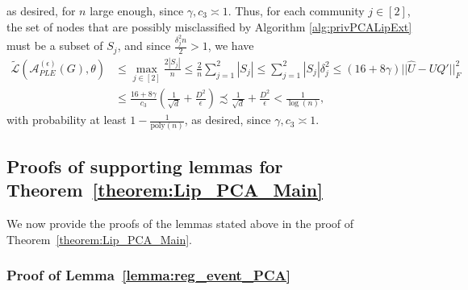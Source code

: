 \documentclass{article}
\begin{document}
as desired, for $n$ large enough, since $\gamma, c_3 \asymp 1$. Thus, for each
community $j \in [2]$, the set of nodes that are possibly misclassified by Algorithm \ref{alg:privPCALipExt} must be a subset of $S_j$, and since $\frac{\delta_j^2n}{2} > 1$, we have
\begin{align*}
\widetilde{\mathcal{L}}\left(\mathcal{A}_{PLE}^{(\epsilon)}(G), \theta\right) &\leq \mathop{\max}_{j \in [2]}\frac{2|S_j|}{n} \leq \frac{2}{n}\sum_{j = 1}^2|S_j| \leq \sum_{j = 1}^2|S_j|\delta_j^2 \leq (16 + 8\gamma)||\hat{U} - UQ'||_F^2\\
&\leq \frac{16 + 8\gamma}{c_3} \left(\frac{1}{\sqrt{d}} + \frac{D^2}{\epsilon}\right) \precsim \frac{1}{\sqrt{d}} + \frac{D^2}{\epsilon} < \frac{1}{\log(n)},
\end{align*}
with probability at least $1 - \frac{1}{\mathrm{poly}(n)}$, as desired, since $\gamma, c_3 \asymp 1$.


\subsection{Proofs of supporting lemmas for Theorem~\ref{theorem:Lip_PCA_Main}}

We now provide the proofs of the lemmas stated above in the proof of Theorem~\ref{theorem:Lip_PCA_Main}.

\subsubsection{Proof of Lemma~\ref{lemma:reg_event_PCA}}
\label{AppLemRegEvent}
\end{document}
